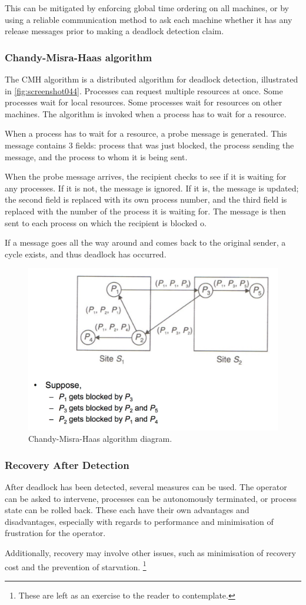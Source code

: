 This can be mitigated by enforcing global time ordering on all machines, or by using a reliable communication method to ask each machine whether it has any release messages prior to making a deadlock detection claim.

\subsubsection{Chandy-Misra-Haas algorithm}
The CMH algorithm is a distributed algorithm for deadlock detection, illustrated in \autoref{fig:screenshot044}. Processes can request multiple resources at once. Some processes wait for local resources. Some processes wait for resources on other machines. The algorithm is invoked when a process has to wait for a resource.

When a process has to wait for a resource, a probe message is generated. This message contains 3 fields: process that was just blocked, the process sending the message, and the process to whom it is being sent.

When the probe message arrives, the recipient checks to see if it is waiting for any processes. If it is not, the message is ignored. If it is, the message is updated; the second field is replaced with its own process number, and the third field is replaced with the number of the process it is waiting for. The message is then sent to each process on which the recipient is blocked o.

If a message goes all the way around and comes back to the original sender, a cycle exists, and thus deadlock has occurred.

\begin{figure}[h]
\centering
\includegraphics[width=0.5\linewidth]{figures/screenshot044}
\caption{Chandy-Misra-Haas algorithm diagram.}
\label{fig:screenshot044}
\end{figure}

\subsubsection{Recovery After Detection}
After deadlock has been detected, several measures can be used. The operator can be asked to intervene, processes can be autonomously terminated, or process state can be rolled back. These each have their own advantages and disadvantages, especially with regards to performance and minimisation of frustration for the operator.

Additionally, recovery may involve other issues, such as minimisation of recovery cost and the prevention of starvation. \footnote{These are left as an exercise to the reader to contemplate.}
